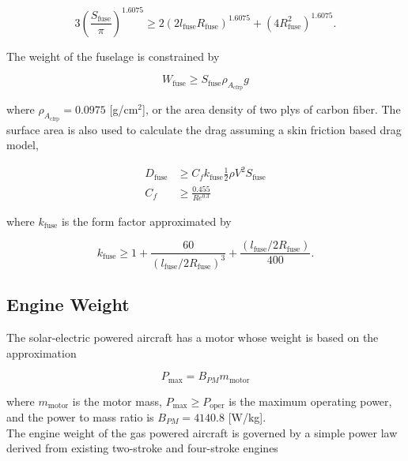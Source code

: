 \documentclass[]{aiaa-tc}%
\begin{document}
\begin{equation}
    \label{e:fusesa}
    3 \left( \frac{S_{\text{fuse}}}{\pi} \right)^{1.6075} \geq 2(2l_{\text{fuse}}R_{\text{fuse}})^{1.6075} + (4R_{\text{fuse}}^2)^{1.6075}.
\end{equation}

The weight of the fuselage is constrained by

\begin{equation}
    \label{e:fuseweight}
    W_{\text{fuse}} \geq S_{\text{fuse}} \rho_{A_{\text{cfrp}}} g
\end{equation} 

where $\rho_{A_{\text{cfrp}}} = 0.0975$ [g/cm$^2$], or the area density of two plys of carbon fiber.\cite{carbonfiber}  The surface area is also used to calculate the drag assuming a skin friction based drag model,

\begin{align}
    \label{e:fusedrag}
    D_{\text{fuse}} &\geq C_f k_{\text{fuse}} \frac{1}{2} \rho V^2 S_{\text{fuse}} \\
    C_f &\geq \frac{0.455}{Re^{0.3}}
\end{align}

where $k_{\text{fuse}}$ is the form factor approximated by\cite{raymer}

\begin{equation}
    \label{e:fuseform}
    k_{\text{fuse}} \geq 1 + \frac{60}{(l_{\text{fuse}}/2R_{\text{fuse}})^3} + \frac{(l_{\text{fuse}}/2R_{\text{fuse}})}{400}.
\end{equation}

\subsection{Engine Weight}

The solar-electric powered aircraft has a motor whose weight is based on the approximation\cite{electricengine}

\begin{equation}
    \label{e:electricengine}
    P_{\text{max}} = B_{PM} m_{\text{motor}}
\end{equation}

where $m_{\text{motor}}$ is the motor mass, $P_{\text{max}} \geq P_{\text{oper}}$ is the maximum operating power, and the power to mass ratio is $B_{PM} = 4140.8$ [W/kg]. \\

The engine weight of the gas powered aircraft is governed by a simple power law derived from existing two-stroke and four-stroke engines\cite{gasengine}
\end{document}
